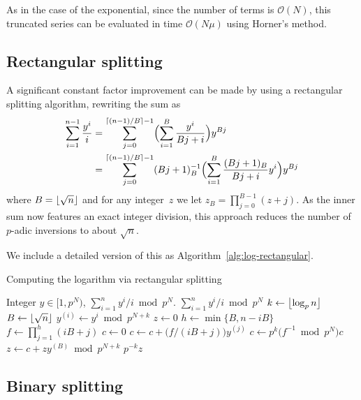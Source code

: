 As in the case of the exponential, since the number of terms 
is $\mathcal{O}(N)$, this truncated series can be evaluated 
in time $\mathcal{O}(N \mu)$ using Horner's method.

\subsection{Rectangular splitting}

A significant constant factor improvement can be made by using 
a rectangular splitting algorithm, rewriting the sum as 
\begin{align}
\sum_{i=1}^{n-1} \frac{y^i}{i}
& = \sum_{j=0}^{\left\lceil(n-1)/B\right\rceil - 1} \Bigl( \sum_{i=1}^B \frac{y^i}{Bj + i} \Bigr) y^{Bj} \\
& = \sum_{j=0}^{\left\lceil(n-1)/B\right\rceil - 1} (Bj+1)_B^{-1} \Bigl( \sum_{i=1}^B \frac{(Bj+1)_B}{Bj + i} y^i \Bigr) y^{Bj}
\end{align}
where $B = \left\lfloor\sqrt{n}\right\rfloor$ and for any integer~$z$ 
we let $z_B = \prod_{j=0}^{B-1} (z + j)$.  As the inner 
sum now features an exact integer division, this approach 
reduces the number of $p$-adic inversions to about $\sqrt{n}$.

We include a detailed version of this as 
Algorithm~\ref{alg:log-rectangular}.

\begin{algorithm}
\caption{Computing the logarithm via rectangular splitting}
\label{alg:log-rectangular}
\begin{algorithmic}
\vspace{1mm}
\Require Integer $y \in [1,p^N)$, 
\Ensure  $\sum_{i=1}^n y^i / i \bmod{p^N}$.
\Return $\sum_{i=1}^{n} y^i / i \bmod{p^N}$
\Else
\State $k \gets \left\lfloor\log_p n\right\rfloor$
\State $B \gets \left\lfloor\sqrt{n}\right\rfloor$
\State $y^{(i)} \gets y^i \bmod {p^{N + k}}$
\EndFor
\State $z \gets 0$
\State $h \gets \min\{ B, n - iB \}$
\State $f \gets \prod_{j=1}^{h} (iB + j)$
\State $c \gets 0$
\State $c \gets c + \bigl(f / (iB + j)\bigr) y^{(j)}$
\EndFor
\State $c \gets p^k \bigl(f^{-1} \bmod {p^N}\bigr) c$
\State $z \gets c + z y^{(B)} \bmod{p^{N+k}}$
\EndFor
\Return $p^{-k} z$
\EndIf
\EndProcedure
\end{algorithmic}
\end{algorithm}

\subsection{Binary splitting}

